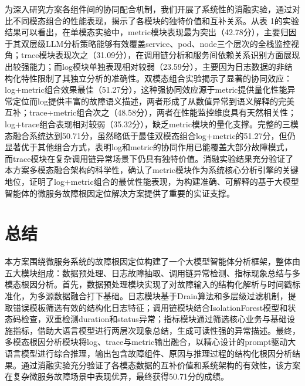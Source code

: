 \documentclass[11pt]{article}
\begin{document}
为深入研究方案各组件间的协同配合机制，我们开展了系统性的消融实验，通过对比不同模态组合的性能表现，揭示了各模块的独特价值和互补关系。从表 1的实验结果可以看出，在单模态实验中，metric模块表现最为突出（42.78分），主要归因于其双层级LLM分析策略能够有效覆盖service、pod、node三个层次的全栈监控视角；trace模块表现次之（31.09分），在调用链分析和服务间依赖关系识别方面展现出较强能力；而log模块单独表现相对较弱（23.59分），主要因为日志数据的非结构化特性限制了其独立分析的准确性。双模态组合实验揭示了显著的协同效应：log+metric组合效果最佳（51.27分），这种强协同效应源于metric提供量化性能异常定位而log提供丰富的故障语义描述，两者形成了从数值异常到语义解释的完美互补；trace+metric组合次之（48.58分），两者在性能监控维度具有天然相关性；log+trace组合表现相对较弱（35.32分），缺乏metric模块的量化支撑。完整的三模态融合系统达到50.71分，虽然略低于最佳双模态组合log+metric的51.27分，但仍显著优于其他组合方式，表明log和metric的协同作用已能覆盖大部分故障模式，而trace模块在复杂调用链异常场景下仍具有独特价值。消融实验结果充分验证了本方案多模态融合架构的科学性，确认了metric模块作为系统核心分析引擎的关键地位，证明了log+metric组合的最优性能表现，为构建准确、可解释的基于大模型智能体的微服务故障根因定位解决方案提供了重要的实证支撑。

\section{总结}

本方案围绕微服务系统的故障根因定位构建了一个大模型智能体分析框架，整体由五大模块组成：数据预处理、日志故障抽取、调用链异常检测、指标现象总结与多模态根因分析。首先，数据预处理模块实现了对故障输入的结构化解析与时间戳标准化，为多源数据融合打下基础。日志模块基于Drain算法和多层级过滤机制，提取错误模板筛选有效的结构化日志特征；调用链模块结合IsolationForest模型和状态码检查，双重检测duration和status异常；指标模块通过筛选核心业务与基础设施指标，借助大语言模型进行两层次现象总结，生成可读性强的异常描述。最终，多模态根因分析模块将log、trace与metric输出融合，以精心设计的prompt驱动大语言模型进行综合推理，输出包含故障组件、原因与推理过程的结构化根因分析结果。通过消融实验充分验证了各模态数据的互补价值和系统架构的有效性，该方案在复杂微服务故障场景中表现优异，最终获得50.71分的成绩。

%

\end{document}
